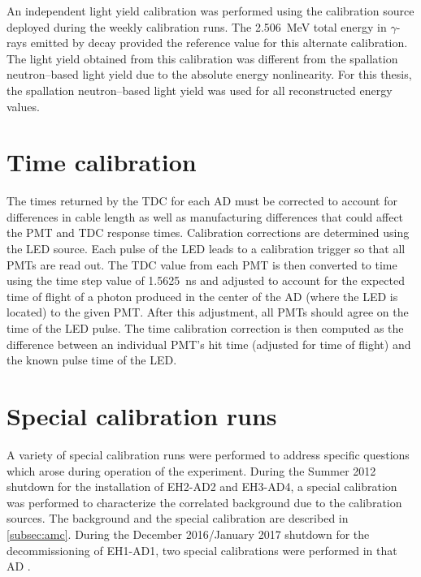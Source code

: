 An independent light yield calibration was performed
using the  calibration source
deployed during the weekly calibration runs.
The \SI{2.506}{\MeV} total energy in $\gamma$-rays emitted by  decay
provided the reference value for this alternate calibration.
The light yield obtained from this calibration
was different from the spallation neutron--based light yield
due to the absolute energy nonlinearity.
For this thesis, the spallation neutron--based light yield was used
for all reconstructed energy values.

\section{Time calibration}
\label{sec:time_calib}

The times returned by the TDC for each AD must be corrected
to account for differences in cable length as well as
manufacturing differences that could affect the PMT and TDC response times.
Calibration corrections are determined using the LED source.
Each pulse of the LED leads to a calibration trigger so that all PMTs are read out.
The TDC value from each PMT is then converted to time using the
time step value of \SI{1.5625}{\ns} and adjusted
to account for the expected time of flight
of a photon produced in the center of the AD (where the LED is located)
to the given PMT.
After this adjustment, all PMTs should agree on the time of the LED pulse.
The time calibration correction is then computed
as the difference between an individual PMT's hit time
(adjusted for time of flight)
and the known pulse time of the LED.

\section{Special calibration runs}
\label{sec:special_calib}

A variety of special calibration runs were performed
to address specific questions which arose during operation of the experiment.
During the Summer 2012 shutdown for the installation of EH2-AD2 and EH3-AD4,
a special calibration was performed to characterize the correlated background
due to the \amc{} calibration sources.
The \amc{} background and the special calibration are described in \cref{subsec:amc}.
During the December 2016/January 2017 shutdown for the decommissioning of EH1-AD1,
two special calibrations were performed in that AD \cite{calib_proposal2017}.

